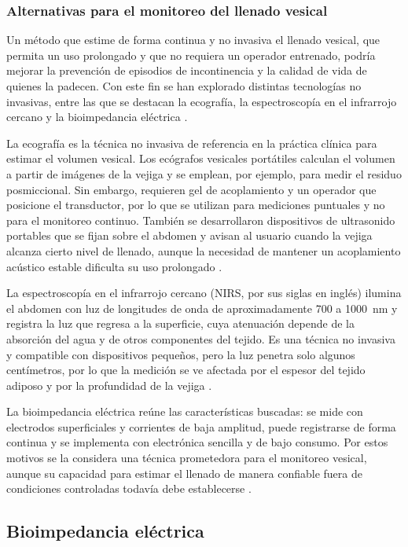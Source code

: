 \documentclass[12pt,a4paper]{article}
\begin{document}
\subsubsection{Alternativas para el monitoreo del llenado vesical}

Un método que estime de forma continua y no invasiva el llenado vesical, que permita un uso
prolongado y que no requiera un operador entrenado, podría mejorar la prevención de episodios de
incontinencia y la calidad de vida de quienes la padecen. Con este fin se han explorado distintas
tecnologías no invasivas, entre las que se destacan la ecografía, la espectroscopía en el infrarrojo
cercano y la bioimpedancia eléctrica \cite{palla2023review}.

La ecografía es la técnica no invasiva de referencia en la práctica clínica para estimar el volumen
vesical. Los ecógrafos vesicales portátiles calculan el volumen a partir de imágenes de la vejiga y se
emplean, por ejemplo, para medir el residuo posmiccional. Sin embargo, requieren gel de acoplamiento y
un operador que posicione el transductor, por lo que se utilizan para mediciones puntuales y no para
el monitoreo continuo. También se desarrollaron dispositivos de ultrasonido portables que se fijan
sobre el abdomen y avisan al usuario cuando la vejiga alcanza cierto nivel de llenado, aunque la
necesidad de mantener un acoplamiento acústico estable dificulta su uso prolongado
\cite{palla2023review}.

La espectroscopía en el infrarrojo cercano (NIRS, por sus siglas en inglés) ilumina el abdomen con luz
de longitudes de onda de aproximadamente 700 a 1000~nm y registra la luz que regresa a la superficie,
cuya atenuación depende de la absorción del agua y de otros componentes del tejido. Es una técnica no
invasiva y compatible con dispositivos pequeños, pero la luz penetra solo algunos centímetros, por lo
que la medición se ve afectada por el espesor del tejido adiposo y por la profundidad de la vejiga
\cite{palla2023review}.

La bioimpedancia eléctrica reúne las características buscadas: se mide con electrodos
superficiales y corrientes de baja amplitud, puede registrarse de forma continua y se implementa con
electrónica sencilla y de bajo consumo. Por estos motivos se la considera una técnica prometedora para
el monitoreo vesical, aunque su capacidad para estimar el llenado de manera confiable fuera de
condiciones controladas todavía debe establecerse \cite{palla2023review,noyori2022review}.

\subsection{Bioimpedancia eléctrica}
\end{document}
